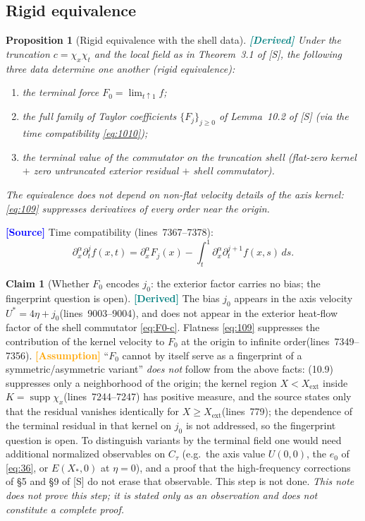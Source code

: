 \documentclass[11pt,a4paper]{article}
\newtheorem{proposition}[theorem]{Proposition}
\theoremstyle{definition}
\newtheorem{claim}[theorem]{Claim}
\theoremstyle{remark}
\newcommand{\lnos}[1]{(lines~#1)}
\newcommand{\ORIG}{\textcolor{blue}{\textbf{[Source]}}}
\newcommand{\DER}{\textcolor{teal}{\textbf{[Derived]}}}
\newcommand{\HYP}{\textcolor{orange}{\textbf{[Assumption]}}}
\newcommand{\notproved}{\emph{This note does not prove this step; it is stated only as an observation
and does not constitute a complete proof.}}
\begin{document}
\subsection{Rigid equivalence}
\label{sec:note2-rigid}

\begin{proposition}[Rigid equivalence with the shell data]
\label{prop:rigid}
\DER
Under the truncation $c=\chi_x\chi_t$ and the local field as in Theorem~3.1 of [S], the following
three data determine one another (rigid equivalence):
\begin{enumerate}
\item the terminal force $F_0=\lim_{t\uparrow 1}f$;
\item the full family of Taylor coefficients $\{F_j\}_{j\ge 0}$ of Lemma~10.2 of [S]
(via the time compatibility \eqref{eq:1010});
\item the terminal value of the commutator on the truncation shell
(flat-zero kernel $+$ zero untruncated exterior residual $+$ shell commutator).
\end{enumerate}
The equivalence does not depend on non-flat velocity details of the axis kernel: \eqref{eq:109}
suppresses derivatives of every order near the origin.
\end{proposition}

\ORIG
Time compatibility \lnos{7367--7378}:
\begin{equation}
\label{eq:1010}
\partial_x^\alpha\partial_t^j f(x,t)
=\partial_x^\alpha F_j(x)
-\int_t^1\partial_x^\alpha\partial_t^{j+1}f(x,s)\,ds.
\end{equation}

\begin{claim}[Whether $F_0$ encodes $j_0$: the exterior factor carries no bias; the fingerprint question is open]
\label{cl:F0-j0}
\DER
The bias $j_0$ appears in the axis velocity $U^*=4\eta+j_0$\lnos{9003--9004},
and does not appear in the exterior heat-flow factor of the shell commutator \eqref{eq:F0-c}.
Flatness \eqref{eq:109} suppresses the contribution of the kernel velocity to $F_0$ at the origin to
infinite order\lnos{7349--7356}.
\HYP
``$F_0$ cannot by itself serve as a fingerprint of a symmetric/asymmetric variant'' \emph{does not}
follow from the above facts: (10.9) suppresses only a neighborhood of the origin; the kernel region
$X<X_{\mathrm{ext}}$ inside $K=\operatorname{supp}\chi_x$\lnos{7244--7247} has positive measure, and the
source states only that the residual vanishes identically for $X\ge X_{\mathrm{ext}}$\lnos{779}; the
dependence of the terminal residual in that kernel on $j_0$ is not addressed, so the fingerprint question
is open.
To distinguish variants by the terminal field one would need additional normalized observables on
$C_\tau$ (e.g.\ the axis value $U(0,0)$, the $e_0$ of \eqref{eq:36}, or $E(X_*,0)$ at $\eta=0$), and a
proof that the high-frequency corrections of \S5 and \S9 of [S] do not erase that observable. This step
is not done.
\notproved
\end{claim}
\end{document}
